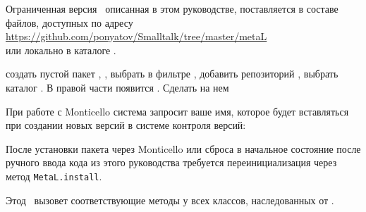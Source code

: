 \clearpage
{}

Ограниченная версия \met\ описанная в этом руководстве, поставляется в составе
файлов, доступных по адресу\\
\url{https://github.com/ponyatov/Smalltalk/tree/master/metaL}\\
или локально в каталоге .


\noindent
создать пустой пакет \met, , выбрать в фильтре \met, добавить репозиторий ,
выбрать каталог . 
В правой части появится . Сделать на нем 



При работе с Monticello система запросит ваше имя, которое будет вставляться при создании новых
версий в системе контроля версий:


\clearpage
После установки пакета через Monticello или сброса в начальное состояние
после ручного ввода кода из этого руководства требуется переинициализация
через метод \verb|MetaL.install|.

\medskip
{}

Этод \ вызовет соответствующие методы у всех классов,
наследованных от .


